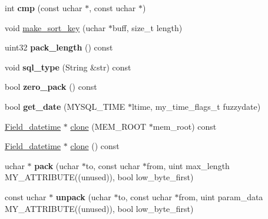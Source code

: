 \begin{DoxyCompactItemize}
\mbox{\label{classField__datetime_ad393c5638784bd2d2cb28252c758da47}} 
int {\bfseries cmp} (const uchar $\ast$, const uchar $\ast$)
\item 
void \mbox{\hyperlink{classField__datetime_a442d561ebb53b6825e336bc69f2a3c3a}{make\+\_\+sort\+\_\+key}} (uchar $\ast$buff, size\+\_\+t length)
\item 
\mbox{\label{classField__datetime_af7f3cae2fa8e23153546841da2275d66}} 
uint32 {\bfseries pack\+\_\+length} () const
\item 
\mbox{\label{classField__datetime_ab0963b19392a81fbfa5a224e32a6740e}} 
void {\bfseries sql\+\_\+type} (String \&str) const
\item 
\mbox{\label{classField__datetime_ac25aeefff37139f39701543967d71392}} 
bool {\bfseries zero\+\_\+pack} () const
\item 
\mbox{\label{classField__datetime_a65a30641841d9209e27b3a2d4feffc01}} 
bool {\bfseries get\+\_\+date} (M\+Y\+S\+Q\+L\+\_\+\+T\+I\+ME $\ast$ltime, my\+\_\+time\+\_\+flags\+\_\+t fuzzydate)
\item 
\mbox{\hyperlink{classField__datetime}{Field\+\_\+datetime}} $\ast$ \mbox{\hyperlink{classField__datetime_acf05a58162e231080d9b1d4e6320abe1}{clone}} (M\+E\+M\+\_\+\+R\+O\+OT $\ast$mem\+\_\+root) const
\item 
\mbox{\hyperlink{classField__datetime}{Field\+\_\+datetime}} $\ast$ \mbox{\hyperlink{classField__datetime_a5711ae971bdea1b9012ff5f683276b1d}{clone}} () const
\item 
\mbox{\label{classField__datetime_aaf5dd84b47a6a4d1163d713854fa7bdd}} 
uchar $\ast$ {\bfseries pack} (uchar $\ast$to, const uchar $\ast$from, uint max\+\_\+length M\+Y\+\_\+\+A\+T\+T\+R\+I\+B\+U\+TE((unused)), bool low\+\_\+byte\+\_\+first)
\item 
\mbox{\label{classField__datetime_acd2771cdf2032c31a3e247abbe7ac4b0}} 
const uchar $\ast$ {\bfseries unpack} (uchar $\ast$to, const uchar $\ast$from, uint param\+\_\+data M\+Y\+\_\+\+A\+T\+T\+R\+I\+B\+U\+TE((unused)), bool low\+\_\+byte\+\_\+first)
\end{DoxyCompactItemize}
